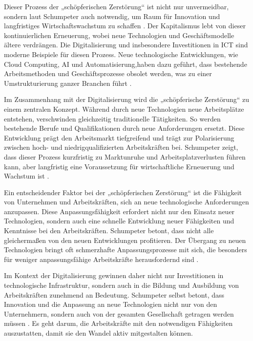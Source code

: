 Dieser Prozess der „schöpferischen Zerstörung“ ist nicht nur unvermeidbar, sondern laut 
Schumpeter auch notwendig, um Raum für Innovation und langfristiges Wirtschaftswachstum zu 
schaffen \parencite[S. 87]{schumpeter1976capitalism}. Der Kapitalismus lebt von dieser 
kontinuierlichen Erneuerung, wobei neue Technologien und Geschäftsmodelle ältere verdrängen. 
Die Digitalisierung und insbesondere Investitionen in \ac{ICT} sind moderne Beispiele für 
diesen Prozess. Neue technologische Entwicklungen, wie Cloud Computing, \ac{AI} und 
Automatisierung,haben dazu geführt, dass bestehende Arbeitsmethoden und Geschäftsprozesse 
obsolet werden, was zu einer Umstrukturierung ganzer Branchen führt 
\parencite[S. 110]{schumpeter1976capitalism}.

Im Zusammenhang mit der Digitalisierung wird die „schöpferische Zerstörung“ zu einem 
zentralen Konzept. Während durch neue Technologien neue Arbeitsplätze entstehen, verschwinden 
gleichzeitig traditionelle Tätigkeiten. So werden bestehende Berufe und Qualifikationen 
durch neue Anforderungen ersetzt. Diese Entwicklung prägt den Arbeitsmarkt tiefgreifend und 
trägt zur Polarisierung zwischen hoch- und niedrigqualifizierten Arbeitskräften bei. 
Schumpeter zeigt, dass dieser Prozess kurzfristig zu Marktunruhe und Arbeitsplatzverlusten 
führen kann, aber langfristig eine Voraussetzung für wirtschaftliche Erneuerung und Wachstum 
ist \parencite[S. 110f]{schumpeter1976capitalism}.

Ein entscheidender Faktor bei der „schöpferischen Zerstörung“ ist die Fähigkeit von 
Unternehmen und Arbeitskräften, sich an neue technologische Anforderungen anzupassen. Diese 
Anpassungsfähigkeit erfordert nicht nur den Einsatz neuer Technologien, sondern auch eine 
schnelle Entwicklung neuer Fähigkeiten und Kenntnisse bei den Arbeitskräften. Schumpeter 
betont, dass nicht alle gleichermaßen von den neuen Entwicklungen profitieren. Der Übergang 
zu neuen Technologien bringt oft schmerzhafte Anpassungsprozesse mit sich, die besonders für 
weniger anpassungsfähige Arbeitskräfte herausfordernd sind 
\parencite[S. 110f]{schumpeter1976capitalism}.

Im Kontext der Digitalisierung gewinnen daher nicht nur Investitionen in technologische 
Infrastruktur, sondern auch in die Bildung und Ausbildung von Arbeitskräften zunehmend an 
Bedeutung. Schumpeter selbst betont, dass Innovation und die Anpassung an neue Technologien 
nicht nur von den Unternehmern, sondern auch von der gesamten Gesellschaft getragen werden 
müssen \parencite[S. 132]{schumpeter1976capitalism}. Es geht darum, die Arbeitskräfte mit 
den notwendigen Fähigkeiten auszustatten, damit sie den Wandel aktiv mitgestalten können. 

